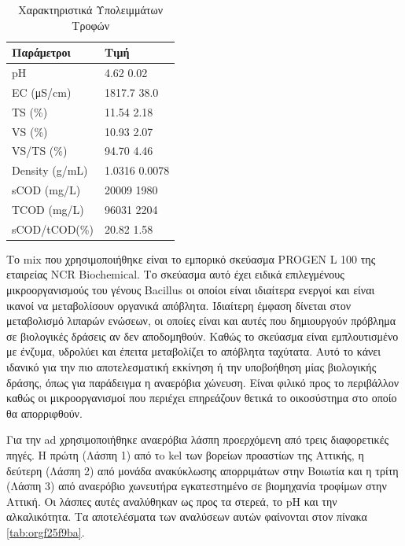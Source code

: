 \documentclass[11pt]{report}
\begin{document}
\begin{table}[htbp]
\caption{\label{tab:org067ab25}Χαρακτηριστικά Υπολειμμάτων Τροφών}
\centering
\begin{tabular}{ll}
Παράμετροι & Τιμή\\[0pt]
\hline
pH & 4.62 \textpm{} 0.02\\[0pt]
EC (μS/cm) & 1817.7 \textpm{} 38.0\\[0pt]
TS (\%) & 11.54 \textpm{} 2.18\\[0pt]
VS (\%) & 10.93 \textpm{} 2.07\\[0pt]
VS/TS (\%) & 94.70 \textpm{} 4.46\\[0pt]
Density (g/mL) & 1.0316 \textpm{} 0.0078\\[0pt]
sCOD (mg/L) & 20009 \textpm{} 1980\\[0pt]
TCOD (mg/L) & 96031 \textpm{} 2204\\[0pt]
sCOD/tCOD(\%) & 20.82 \textpm{} 1.58\\[0pt]
\end{tabular}
\end{table}

Το \acrfull{mix} που χρησιμοποιήθηκε είναι το εμπορικό σκεύασμα PROGEN L 100 της εταιρείας NCR Biochemical. Το σκεύασμα αυτό έχει ειδικά επιλεγμένους μικροοργανισμούς του γένους Bacillus οι οποίοι είναι ιδιαίτερα ενεργοί και είναι ικανοί να μεταβολίσουν οργανικά απόβλητα. Ιδιαίτερη έμφαση δίνεται στον μεταβολισμό λιπαρών ενώσεων, οι οποίες είναι και αυτές που δημιουργούν πρόβλημα σε βιολογικές δράσεις αν δεν αποδομηθούν. Καθώς το σκεύασμα είναι εμπλουτισμένο με ένζυμα, υδρολύει και έπειτα μεταβολίζει το απόβλητα ταχύτατα. Αυτό το κάνει ιδανικό για την πιο αποτελεσματική εκκίνηση ή την υποβοήθηση μίας βιολογικής δράσης, όπως για παράδειγμα η αναερόβια χώνευση. Είναι φιλικό προς το περιβάλλον καθώς οι μικροοργανισμοί που περιέχει επηρεάζουν θετικά το οικοσύστημα στο οποίο θα απορριφθούν.

Για την \acrshort{ad} χρησιμοποιήθηκε αναερόβια λάσπη προερχόμενη από τρεις διαφορετικές πηγές. Η πρώτη (Λάσπη 1) από τo \acrfull{kel} των βορείων προαστίων της Αττικής, η δεύτερη (Λάσπη 2) από μονάδα ανακύκλωσης απορριμάτων στην Βοιωτία και η τρίτη (Λάσπη 3) από αναερόβιο χωνευτήρα εγκατεστημένο σε βιομηχανία τροφίμων στην Αττική. Οι λάσπες αυτές αναλύθηκαν ως προς τα στερεά, το pH και την αλκαλικότητα. Τα αποτελέσματα των αναλύσεων αυτών φαίνονται στον πίνακα \ref{tab:orgf25f9ba}. 
\end{document}
